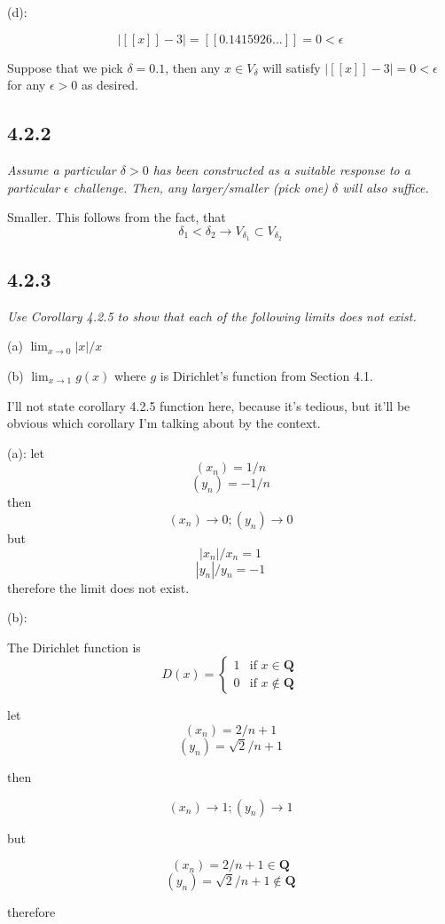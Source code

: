 \documentclass[11pt,oneside,titlepage]{book}
\begin{document}
(d):

$$ |[[x]] - 3| = [[0.1415926...]] = 0 < \epsilon $$

Suppose that we pick $\delta = 0.1$, then any $x \in V_{\delta}$ will satisfy $|[[x]] - 3| = 0 < \epsilon $
for any $\epsilon > 0$ as desired.

\subsection*{4.2.2}
\textit{Assume a particular $\delta > 0$ has been constructed as a suitable response
  to a particular $\epsilon$ challenge. Then, any larger/smaller (pick one) $\delta$ will also suffice.}

Smaller. This follows from the fact, that
$$\delta_1 < \delta_2 \to V_{\delta_1} \subset V_{\delta_2}$$

\subsection*{4.2.3}
\textit{Use Corollary 4.2.5 to show that each of the following limits does not exist.}

(a) $\lim_{x\to0} |x|/x$

(b) $\lim_{x\to 1} g(x)$ where $g$ is Dirichlet’s function from Section 4.1.

I'll not state corollary 4.2.5  function here, because it's tedious, but it'll be obvious which corollary I'm talking about by the context.


(a): let
$$(x_n) = 1/n$$
$$(y_n) = -1/n$$
then
$$(x_n) \to 0;(y_n) \to 0$$
but
$$|x_n| / x_n = 1$$
$$|y_n| / y_n = -1$$
therefore the limit does not exist.

(b):

The Dirichlet function is
\begin{equation}
D(x)=
    \begin{cases}
        1 & \text{if } x \in \textbf{Q}\\
        0 & \text{if } x \notin \textbf{Q}
    \end{cases}
\end{equation}

let
$$(x_n) = 2/n + 1$$
$$(y_n) = \sqrt{2}/n + 1$$

then

$$(x_n) \to 1;(y_n) \to 1$$

but

$$(x_n) = 2/n + 1 \in \textbf{Q}$$
$$(y_n) = \sqrt{2}/n + 1 \notin \textbf{Q}$$

therefore
\end{document}
